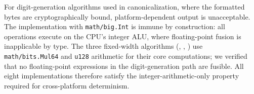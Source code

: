 For digit-generation algorithms used in canonicalization, where the
formatted bytes are cryptographically bound, platform-dependent output
is unacceptable.  The \burgerdybvig implementation with
\texttt{math/big.Int} is immune by construction: all operations execute
on the CPU's integer ALU, where floating-point fusion is inapplicable by
type.  The three fixed-width algorithms (\schubfach, \ryualg,
\dragonbox) use \texttt{math/bits.Mul64} and \texttt{u128} arithmetic
for their core computations; we verified that no floating-point
expressions in the digit-generation path are fusible.  All eight
implementations therefore satisfy the integer-arithmetic-only property
required for cross-platform determinism.
